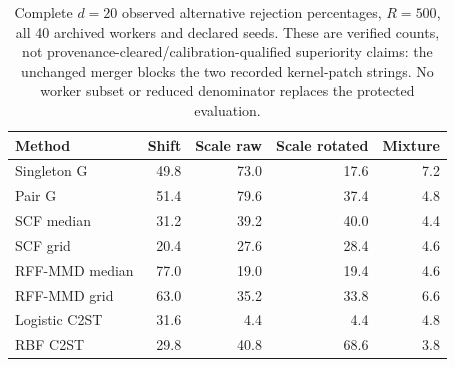 {\color{blue}
\begin{table}[t]
\color{blue}
\centering
\small
\caption{Complete $d=20$ observed alternative rejection percentages, $R=500$, all 40 archived workers and declared seeds. These are verified counts, not provenance-cleared/calibration-qualified superiority claims: the unchanged merger blocks the two recorded kernel-patch strings. No worker subset or reduced denominator replaces the protected evaluation.}
\label{tab:comparator-d20-descriptive}
\setlength{\tabcolsep}{8pt}
\renewcommand{\arraystretch}{1.2}
\begin{tabular}{lrrrr}
\toprule
Method & Shift & Scale raw & Scale rotated & Mixture\\
\midrule
Singleton G & 49.8 & 73.0 & 17.6 & 7.2 \\
Pair G & 51.4 & 79.6 & 37.4 & 4.8 \\
SCF median & 31.2 & 39.2 & 40.0 & 4.4 \\
SCF grid & 20.4 & 27.6 & 28.4 & 4.6 \\
RFF-MMD median & 77.0 & 19.0 & 19.4 & 4.6 \\
RFF-MMD grid & 63.0 & 35.2 & 33.8 & 6.6 \\
Logistic C2ST & 31.6 & 4.4 & 4.4 & 4.8 \\
RBF C2ST & 29.8 & 40.8 & 68.6 & 3.8 \\
\bottomrule
\end{tabular}
\end{table}
}
